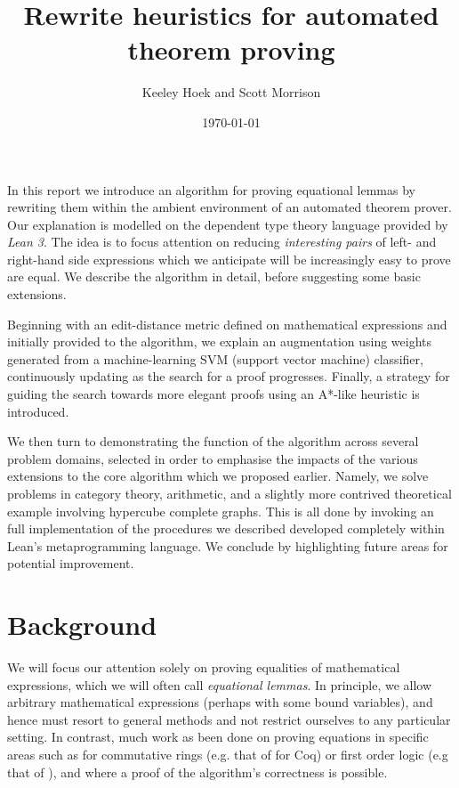 \documentclass[12pt]{article}
\title{Rewrite heuristics for automated theorem proving}
\author{Keeley Hoek and Scott Morrison}
\date{\normalsize \today}
\begin{document}
\maketitle

\noindent

In this report we introduce an algorithm for proving equational lemmas by rewriting them within the ambient environment of an automated theorem prover. Our explanation is modelled on the dependent type theory language provided by \textit{Lean 3}. The idea is to focus attention on reducing \textit{interesting pairs} of left- and right-hand side expressions which we anticipate will be increasingly easy to prove are equal. We describe the algorithm in detail, before suggesting some basic extensions.

Beginning with an edit-distance metric defined on mathematical expressions and initially provided to the algorithm, we explain an augmentation using weights generated from a machine-learning SVM (support vector machine) classifier, continuously updating as the search for a proof progresses. Finally, a strategy for guiding the search towards more elegant proofs using an A*-like heuristic is introduced.

We then turn to demonstrating the function of the algorithm across several problem domains, selected in order to emphasise the impacts of the various extensions to the core algorithm which we proposed earlier. Namely, we solve problems in category theory, arithmetic, and a slightly more contrived theoretical example involving hypercube complete graphs. This is all done by invoking an full implementation of the procedures we described developed completely within Lean's metaprogramming language. We conclude by highlighting future areas for potential improvement.

\section{Background}

We will focus our attention solely on proving equalities of mathematical expressions, which we will often call \textit{equational lemmas}. In principle, we allow arbitrary mathematical expressions (perhaps with some bound variables), and hence must resort to general methods and not restrict ourselves to any particular setting. In contrast, much work as been done on proving equations in specific areas such as for commutative rings (e.g. that of \parencite{gregoire2005proving} for Coq) or first order logic (e.g that of \parencite{bachmair1994rewrite}), and where a proof of the algorithm's correctness is possible.
\end{document}
